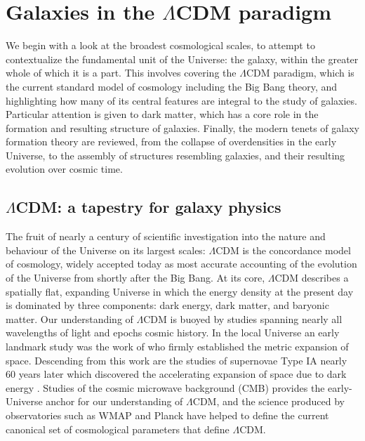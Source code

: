 \section{Galaxies in the \texorpdfstring{$\Lambda$CDM}{LambdaCDM} paradigm}

We begin with a look at the broadest cosmological scales, to attempt to contextualize the fundamental unit of the Universe: the galaxy, within the greater whole of which it is a part. This involves covering the $\Lambda$CDM paradigm, which is the current standard model of cosmology including the Big Bang theory, and highlighting how many of its central features are integral to the study of galaxies. Particular attention is given to dark matter, which has a core role in the formation and resulting structure of galaxies. Finally, the modern tenets of galaxy formation theory are reviewed, from the collapse of overdensities in the early Universe, to the assembly of structures resembling galaxies, and their resulting evolution over cosmic time.

\subsection{\texorpdfstring{$\Lambda$CDM}{LambdaCDM}: a tapestry for galaxy physics}

The fruit of nearly a century of scientific investigation into the nature and behaviour of the Universe on its largest scales: $\Lambda$CDM is the concordance model of cosmology, widely accepted today as most accurate accounting of the evolution of the Universe from shortly after the Big Bang. At its core, $\Lambda$CDM describes a spatially flat, expanding Universe in which the energy density at the present day is dominated by three components: dark energy, dark matter, and baryonic matter. Our understanding of $\Lambda$CDM is buoyed by studies spanning nearly all wavelengths of light and epochs cosmic history. In the local Universe an early landmark study was the work of \textcite{hubble29} who firmly established the metric expansion of space. Descending from this work are the studies of supernovae Type IA nearly 60 years later which discovered the accelerating expansion of space due to dark energy \parencite{riess98,perlmutter99}. Studies of the cosmic microwave background (CMB) provides the early-Universe anchor for our understanding of $\Lambda$CDM, and the science produced by observatories such as WMAP and Planck have helped to define the current canonical set of cosmological parameters that define $\Lambda$CDM.

